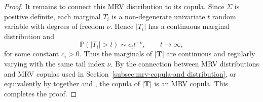 \documentclass[12pt]{article}
\theoremstyle{plain}
\theoremstyle{plain}
\theoremstyle{definition}
\renewcommand{\Pr}{\mathbb{P}}
\begin{document}
\begin{proof}
It remains to connect this MRV distribution to its copula. Since
$\Sigma$ is positive definite, each marginal $T_i$ is a non-degenerate
univariate $t$ random variable with degrees of freedom $\nu$. Hence
$|T_i|$ has a continuous marginal distribution and
\[
\Pr(|T_i|>t)\sim c_i t^{-\nu},
\qquad t\to\infty,
\]
for some constant $c_i>0$. Thus the marginals of $|\mathbf{T}|$ are
continuous and regularly varying with the same tail index $\nu$.
By the connection between MRV distributions and MRV copulas used in
Section~\ref{subsec:mrv-copula-and distribution}, or equivalently by
\citep[Corollary~5.18]{resnick2008extreme} together and  \citep[Eq.~(8.79)]{beirlant2006statistics}, the copula of
$|\mathbf{T}|$ is an MRV copula. This completes the proof.
\end{proof}
 
\end{document}
